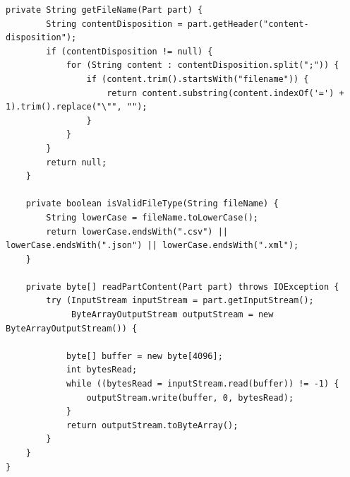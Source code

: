 \begin{lstlisting}[style=java]
    private String getFileName(Part part) {
        String contentDisposition = part.getHeader("content-disposition");
        if (contentDisposition != null) {
            for (String content : contentDisposition.split(";")) {
                if (content.trim().startsWith("filename")) {
                    return content.substring(content.indexOf('=') + 1).trim().replace("\"", "");
                }
            }
        }
        return null;
    }
    
    private boolean isValidFileType(String fileName) {
        String lowerCase = fileName.toLowerCase();
        return lowerCase.endsWith(".csv") || lowerCase.endsWith(".json") || lowerCase.endsWith(".xml");
    }
    
    private byte[] readPartContent(Part part) throws IOException {
        try (InputStream inputStream = part.getInputStream();
             ByteArrayOutputStream outputStream = new ByteArrayOutputStream()) {
            
            byte[] buffer = new byte[4096];
            int bytesRead;
            while ((bytesRead = inputStream.read(buffer)) != -1) {
                outputStream.write(buffer, 0, bytesRead);
            }
            return outputStream.toByteArray();
        }
    }
}
\end{lstlisting}


